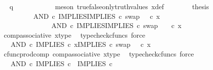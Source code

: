 \begin{isabellebody}
\ \isamarkupfalse%
\ {\isachardoublequoteopen}q\ {\isacharequal}{\kern0pt}\ {\isasymf}{\isachardoublequoteclose}\isanewline
\ \ \ \ \ \ \ \ \isamarkupfalse%
\ {\isacharparenleft}{\kern0pt}meson\ true{\isacharunderscore}{\kern0pt}false{\isacharunderscore}{\kern0pt}only{\isacharunderscore}{\kern0pt}truth{\isacharunderscore}{\kern0pt}values\ x{\isacharunderscore}{\kern0pt}def{\isacharparenright}{\kern0pt}\isanewline
\ \ \ \ \ \ \isamarkupfalse%
\ {\isacharquery}{\kern0pt}thesis\isanewline
\ \ \ \ \ \ \isamarkupfalse%
\ {\isacharminus}{\kern0pt}\ \isanewline
\ \ \ \ \ \ \ \ \isamarkupfalse%
\ {\isachardoublequoteopen}{\isacharparenleft}{\kern0pt}AND\ {\isasymcirc}\isactrlsub c\ {\isasymlangle}IMPLIES{\isacharcomma}{\kern0pt}IMPLIES\ {\isasymcirc}\isactrlsub c\ swap\ {\isasymOmega}\ {\isasymOmega}{\isasymrangle}{\isacharparenright}{\kern0pt}\ {\isasymcirc}\isactrlsub c\ x\ {\isacharequal}{\kern0pt}\ \ \ \ \isanewline
\ \ \ \ \ \ \ \ \ \ \ \ \ \ \ AND\ {\isasymcirc}\isactrlsub c\ {\isasymlangle}IMPLIES{\isacharcomma}{\kern0pt}IMPLIES\ {\isasymcirc}\isactrlsub c\ swap\ {\isasymOmega}\ {\isasymOmega}{\isasymrangle}\ \ {\isasymcirc}\isactrlsub c\ x{\isachardoublequoteclose}\isanewline
\ \ \ \ \ \ \ \ \ \ \isamarkupfalse%
\ comp{\isacharunderscore}{\kern0pt}associative{}\ x{\isacharunderscore}{\kern0pt}type\ \isamarkupfalse%
\ {\isacharparenleft}{\kern0pt}typecheck{\isacharunderscore}{\kern0pt}cfuncs{\isacharcomma}{\kern0pt}\ force{\isacharparenright}{\kern0pt}\isanewline
\ \ \ \ \ \ \ \ \isamarkupfalse%
\ \isamarkupfalse%
\ {\isachardoublequoteopen}{\isachardot}{\kern0pt}{\isachardot}{\kern0pt}{\isachardot}{\kern0pt}\ {\isacharequal}{\kern0pt}\ AND\ {\isasymcirc}\isactrlsub c\ {\isasymlangle}IMPLIES\ {\isasymcirc}\isactrlsub c\ x{\isacharcomma}{\kern0pt}IMPLIES\ {\isasymcirc}\isactrlsub c\ swap\ {\isasymOmega}\ {\isasymOmega}\ {\isasymcirc}\isactrlsub c\ x{\isasymrangle}{\isachardoublequoteclose}\isanewline
\ \ \ \ \ \ \ \ \ \ \isamarkupfalse%
\ cfunc{\isacharunderscore}{\kern0pt}prod{\isacharunderscore}{\kern0pt}comp\ comp{\isacharunderscore}{\kern0pt}associative{}\ x{\isacharunderscore}{\kern0pt}type\ \isamarkupfalse%
\ {\isacharparenleft}{\kern0pt}typecheck{\isacharunderscore}{\kern0pt}cfuncs{\isacharcomma}{\kern0pt}\ force{\isacharparenright}{\kern0pt}\isanewline
\ \ \ \ \ \ \ \ \isamarkupfalse%
\ \isamarkupfalse%
\ {\isachardoublequoteopen}{\isachardot}{\kern0pt}{\isachardot}{\kern0pt}{\isachardot}{\kern0pt}\ {\isacharequal}{\kern0pt}\ AND\ {\isasymcirc}\isactrlsub c\ {\isasymlangle}IMPLIES\ {\isasymcirc}\isactrlsub c\ {\isasymlangle}{\isasymf}{\isacharcomma}{\kern0pt}{\isasymf}{\isasymrangle}{\isacharcomma}{\kern0pt}\ IMPLIES\ {\isasymcirc}\isactrlsub c\ {\isasymlangle}{\isasymf}{\isacharcomma}{\kern0pt}{\isasymf}{\isasymrangle}{\isasymrangle}{\isachardoublequoteclose}\isanewline

\end{isabellebody}
